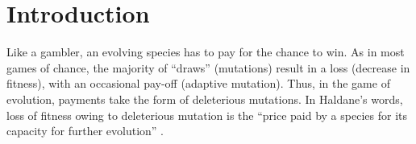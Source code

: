 \documentclass[11pt]{article}
\begin{document}
\begin{abstract}

\end{abstract}
\thispagestyle{empty}

\clearpage

\section*{Introduction}

Like a gambler, an evolving species has to pay for the chance to win.    As in most games of chance, the majority of ``draws'' (mutations) result in a loss (decrease in fitness), with an occasional pay-off (adaptive mutation).  Thus, in the game of evolution, payments take the form of deleterious mutations. In Haldane's words, loss of fitness owing to deleterious mutation is the ``price paid by a species for its capacity for further evolution'' \cite{HALD37}.
\end{document}
